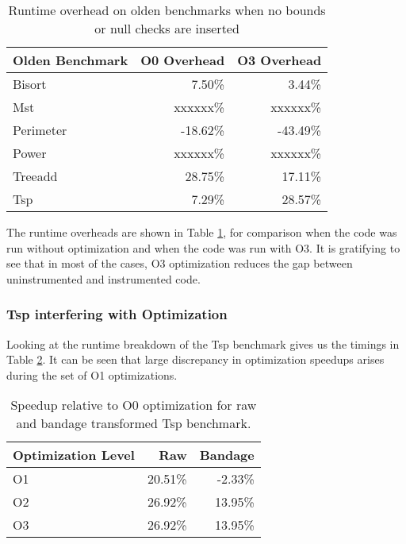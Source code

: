 \begin{table}
\centering
\begin{tabular}{|l|r|r|}
\hline \textbf{Olden Benchmark} & \textbf{O0 Overhead} & \textbf{O3 Overhead}\\
\hline Bisort       &   7.50\%   &   3.44\% \\
\hline Mst          & xxxxxx\%   & xxxxxx\% \\
\hline Perimeter    & -18.62\%   & -43.49\% \\
\hline Power        & xxxxxx\%   & xxxxxx\% \\
\hline Treeadd      &  28.75\%   &  17.11\% \\
\hline Tsp          &   7.29\%   &  28.57\% \\
\hline
\end{tabular}
\label{tab:NoChecks}
\caption{Runtime overhead on olden benchmarks when no bounds or null checks are inserted}
\end{table}

The runtime overheads are shown in Table \ref{tab:NoChecks}, for comparison when the code was run without optimization and when the code was run with O3.
It is gratifying to see that in most of the cases, O3 optimization reduces the gap between uninstrumented and instrumented code.

\subsubsection{Tsp interfering with Optimization}

Looking at the runtime breakdown of the Tsp benchmark gives us the timings in Table \ref{tab:TspNoChecks}.
It can be seen that large discrepancy in optimization speedups arises during the set of O1 optimizations.

\begin{table}
\centering
\begin{tabular}{|l|r|r|}
\hline  \textbf{Optimization Level}  &   \textbf{Raw} &   \textbf{Bandage} \\
\hline  O1  &   20.51\%  &   -2.33\%  \\
\hline  O2  &   26.92\%  &   13.95\%  \\
\hline  O3  &   26.92\%  &   13.95\%  \\
\hline
\end{tabular}
\label{tab:TspNoChecks}
\caption{Speedup relative to O0 optimization for raw and bandage transformed Tsp benchmark.}
\end{table}


